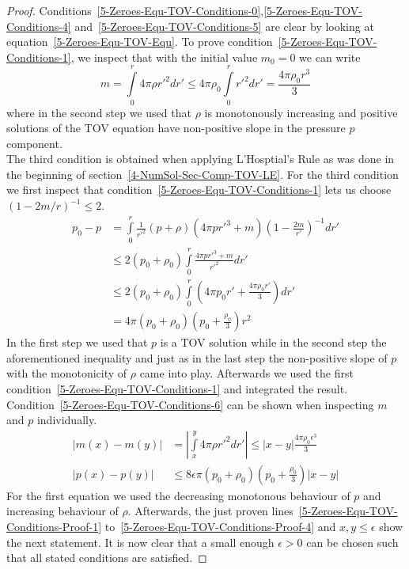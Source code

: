 \begin{proof}
	Conditions~\eqref{5-Zeroes-Equ-TOV-Conditions-0},\eqref{5-Zeroes-Equ-TOV-Conditions-4} and~\eqref{5-Zeroes-Equ-TOV-Conditions-5} are clear by looking at equation~\eqref{5-Zeroes-Equ-TOV-Equ}.
	To prove condition~\eqref{5-Zeroes-Equ-TOV-Conditions-1}, we inspect that with the initial value $m_0=0$ we can write
	\[
		m = \int\limits_0^r 4\pi\rho r'^2 dr'\leq4\pi\rho_0\int\limits_0^r r'^2 dr'=\frac{4\pi\rho_0 r^3}{3}
	\]
	where in the second step we used that $\rho$ is monotonously increasing and positive solutions of the \ac{TOV} equation have non-positive slope in the pressure $p$ component.\\
	The third condition is obtained when applying L'Hosptial's Rule as was done in the beginning of section~\ref{4-NumSol-Sec-Comp-TOV-LE}.
	For the third condition we first inspect that condition~\ref{5-Zeroes-Equ-TOV-Conditions-1} lets us choose $(1-2m/r)^{-1}\leq 2$.
	\begin{align}
		p_0 - p &=\int\limits_0^r\frac{1}{r'^2}\left(p+\rho\right)\left(4\pi pr'^3+m\right)\left(1-\frac{2m}{r'}\right)^{-1}dr'\label{5-Zeroes-Equ-TOV-Conditions-Proof-1}\\
				&\leq2\left(p_0+\rho_0\right)\int\limits_0^r\frac{4\pi pr'^3+m}{r'^2}dr'\label{5-Zeroes-Equ-TOV-Conditions-Proof-2}\\
				&\leq2(p_0+\rho_0)\int\limits_0^r\left(4\pi p_0 r' + \frac{4\pi\rho_0 r'}{3}\right)dr'\label{5-Zeroes-Equ-TOV-Conditions-Proof-3}\\
				&=4\pi(p_0+\rho_0)\left(p_0+\frac{\rho_0}{3}\right)r^2\label{5-Zeroes-Equ-TOV-Conditions-Proof-4}
	\end{align}
	In the first step we used that $p$ is a \ac{TOV} solution while in the second step the aforementioned inequality and just as in the last step the non-positive slope of $p$ with the monotonicity of $\rho$ came into play.
	Afterwards we used the first condition~\ref{5-Zeroes-Equ-TOV-Conditions-1} and integrated the result.
	Condition~\eqref{5-Zeroes-Equ-TOV-Conditions-6} can be shown when inspecting $m$ and $p$ individually.
	\begin{align}
		|m(x)-m(y)|&=\left|\int\limits_x^y 4\pi\rho r'^2 dr'\right|\leq|x-y|\frac{4\pi\rho_0\epsilon^3}{3}\\
		|p(x)-p(y)|&\leq8\epsilon\pi(p_0+\rho_0)\left(p_0+\frac{\rho_0}{3}\right)|x-y|
	\end{align}
	For the first equation we used the decreasing monotonous behaviour of $p$ and increasing behaviour of $\rho$.
	Afterwards, the just proven lines~\eqref{5-Zeroes-Equ-TOV-Conditions-Proof-1} to~\eqref{5-Zeroes-Equ-TOV-Conditions-Proof-4} and $x,y\leq\epsilon$ show the next statement.
	It is now clear that a small enough $\epsilon>0$ can be chosen such that all stated conditions are satisfied.
\end{proof}\noindent
